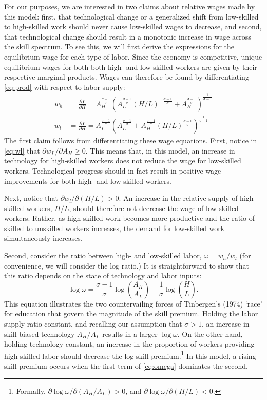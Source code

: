 For our purposes, we are interested in two claims about relative wages made by this model: first, that technological change or a generalized shift from low-skilled to high-skilled work should never cause low-skilled wages to decrease, and second, that technological change should result in a monotonic increase in wage across the skill spectrum. To see this, we will first derive the expressions for the equilibrium wage for each type of labor. Since the economy is competitive, unique equilibrium wages for both both high- and low-skilled workers are given by their respective marginal products. Wages can therefore be found by differentiating \eqref{eq:prod} with respect to labor supply:
\begin{align}
w_h &= \frac{\partial Y}{\partial H} 
     = A_H^\frac{\sigma-1}{\sigma}\left(
              A_L^{\frac{\sigma-1}{\sigma}} (H/L)^{-\frac{\sigma-1}{\sigma}} + A_H^{\frac{\sigma-1}{\sigma}}
        \right)^{\frac{1}{\sigma - 1}} \label{eq:wh} \\
w_l &= \frac{\partial Y}{\partial H} 
     = A_L^\frac{\sigma-1}{\sigma}\left(
              A_L^{\frac{\sigma-1}{\sigma}} + A_H^{\frac{\sigma-1}{\sigma}}(H/L)^{\frac{\sigma-1}{\sigma}}
        \right)^{\frac{1}{\sigma - 1}} \label{eq:wl}
\end{align}
The first claim follows from differentiating these wage equations. First, notice in \eqref{eq:wl} that $\partial w_L/\partial A_H \geq 0$. This means that, in this model, an increase in technology for high-skilled workers does not reduce the wage for low-skilled workers. Technological progress should in fact result in positive wage improvements for both high- and low-skilled workers. 

Next, notice that $\partial w_l/\partial(H/L)>0$. An increase in the relative supply of high-skilled workers, $H/L$, should therefore not decrease the wage of low-skilled workers. Rather, as high-skilled work becomes more productive and the ratio of skilled to unskilled workers increases, the demand for low-skilled work simultaneously increases. 

Second, consider the ratio between high- and low-skilled labor, $\omega=w_h/w_l$ (for convenience, we will consider the log ratio.) It is straightforward to show that this ratio depends on the state of technology and labor inputs:
\begin{equation}\label{eq:omega}
\log \omega = \frac{\sigma-1}{\sigma}\log\left(\frac{A_H}{A_L}\right) - \frac{1}{\sigma}\log\left(\frac{H}{L}\right).
\end{equation} %
This equation illustrates the two countervailing forces of Tinbergen's (1974) `race' for education that govern the magnitude of the skill premium. Holding the labor supply ratio constant, and recalling our assumption that $\sigma >1$, an increase in skill-biased technology $A_H/A_L$ results in a larger $\log\omega$. On the other hand, holding technology constant, an increase in the proportion of workers providing high-skilled labor should decrease the log skill premium.\footnote{Formally, $\partial \log\omega / \partial(A_H/A_L) > 0$, and 
$\partial \log\omega / \partial(H/L) < 0$.} In this model, a rising skill premium occurs when the first term of \eqref{eq:omega}  dominates the second.

